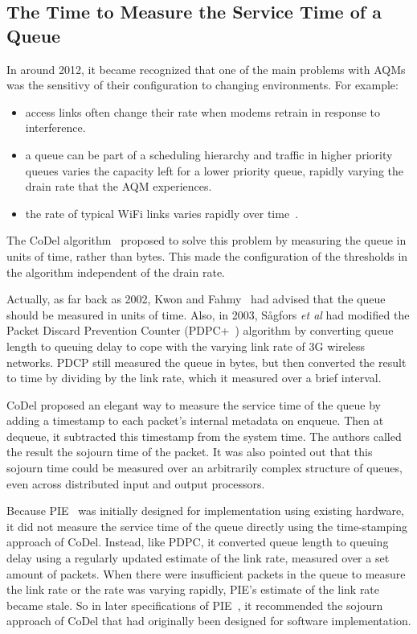 \subsection{The Time to Measure the Service Time of a Queue}\label{sec:svc_time}

In around 2012, it became recognized that one of the main problems with AQMs was the sensitivy of their configuration to changing environments. For example:
\begin{itemize}
	\item access links often change their rate when modems retrain in response to interference. 
	\item a queue can be part of a scheduling hierarchy and traffic in higher priority queues varies the capacity left for a lower priority queue, rapidly varying the drain rate that the AQM experiences.
	\item the rate of typical WiFi links varies rapidly over time~\cite{McGregor10:Minstrel_TR}.
\end{itemize}

The CoDel algorithm~\cite{Nichols12:CoDel} proposed to solve this problem by measuring the queue in units of time, rather than bytes. This made the configuration of the thresholds in the algorithm independent of the drain rate.

Actually, as far back as 2002, 
Kwon and Fahmy~\cite{Kwon02:Load_v_Queue_AQM} had advised that the queue should 
be measured in units of time. Also, in 2003, S{\aa}gfors \emph{et al} had 
modified the Packet Discard Prevention Counter (PDPC+~\cite{Sagfors03:PDPC_vary}) 
algorithm by converting queue length to queuing delay to cope with the varying 
link rate of 3G wireless networks. PDCP still measured the queue in bytes, but then converted the result to time by dividing by the link rate, which it measured over a brief interval. 

CoDel proposed an elegant way to measure the service time of the queue by adding a timestamp to each packet's internal metadata on enqueue. Then at dequeue, it subtracted this timestamp from the system time. The authors called the result the sojourn time of the packet. It was also pointed out that this sojourn time could be measured over an arbitrarily complex structure of queues, even across distributed input and output processors.

Because PIE~\cite{Pan13:PIE} was initially designed for implementation using existing hardware, it did not measure the service time of the queue directly using the time-stamping approach of CoDel.
Instead, like PDPC, it converted queue length to queuing delay using a regularly updated 
estimate of the link rate, measured over a set amount of packets. When there were insufficient packets in the queue to measure the link rate or the rate was varying rapidly, PIE's estimate of the link rate became stale. So in later specifications of PIE~\cite{Pan17:PIE}, it recommended the sojourn approach of CoDel that had originally been designed for software implementation.

